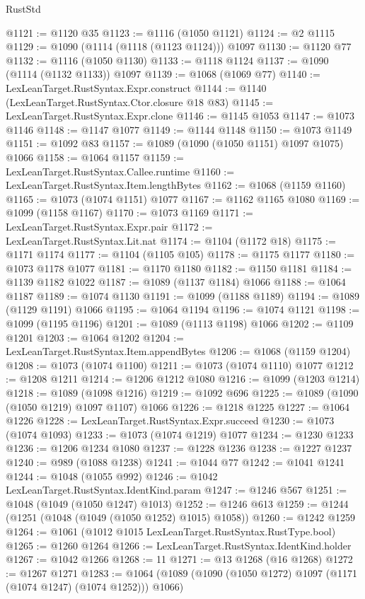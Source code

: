 \begin{lexlean}{RustStd}
\begin{coremodule}
@1121 := @1120 @35
@1123 := @1116 (@1050 @1121)
@1124 := @2 @1115
@1129 := @1090 (@1114 (@1118 (@1123 @1124))) @1097
@1130 := @1120 @77
@1132 := @1116 (@1050 @1130)
@1133 := @1118 @1124
@1137 := @1090 (@1114 (@1132 @1133)) @1097
@1139 := @1068 (@1069 @77)
@1140 := LexLeanTarget.RustSyntax.Expr.construct
@1144 := @1140 (LexLeanTarget.RustSyntax.Ctor.closure @18 @83)
@1145 := LexLeanTarget.RustSyntax.Expr.clone
@1146 := @1145 @1053
@1147 := @1073 @1146
@1148 := @1147 @1077
@1149 := @1144 @1148
@1150 := @1073 @1149
@1151 := @1092 @83
@1157 := @1089 (@1090 (@1050 @1151) @1097 @1075) @1066
@1158 := @1064 @1157
@1159 := LexLeanTarget.RustSyntax.Callee.runtime
@1160 := LexLeanTarget.RustSyntax.Item.lengthBytes
@1162 := @1068 (@1159 @1160)
@1165 := @1073 (@1074 @1151) @1077
@1167 := @1162 @1165 @1080
@1169 := @1099 (@1158 @1167)
@1170 := @1073 @1169
@1171 := LexLeanTarget.RustSyntax.Expr.pair
@1172 := LexLeanTarget.RustSyntax.Lit.nat
@1174 := @1104 (@1172 @18)
@1175 := @1171 @1174
@1177 := @1104 (@1105 @105)
@1178 := @1175 @1177
@1180 := @1073 @1178 @1077
@1181 := @1170 @1180
@1182 := @1150 @1181
@1184 := @1139 @1182 @1022
@1187 := @1089 (@1137 @1184) @1066
@1188 := @1064 @1187
@1189 := @1074 @1130
@1191 := @1099 (@1188 @1189)
@1194 := @1089 (@1129 @1191) @1066
@1195 := @1064 @1194
@1196 := @1074 @1121
@1198 := @1099 (@1195 @1196)
@1201 := @1089 (@1113 @1198) @1066
@1202 := @1109 @1201
@1203 := @1064 @1202
@1204 := LexLeanTarget.RustSyntax.Item.appendBytes
@1206 := @1068 (@1159 @1204)
@1208 := @1073 (@1074 @1100)
@1211 := @1073 (@1074 @1110) @1077
@1212 := @1208 @1211
@1214 := @1206 @1212 @1080
@1216 := @1099 (@1203 @1214)
@1218 := @1089 (@1098 @1216)
@1219 := @1092 @696
@1225 := @1089 (@1090 (@1050 @1219) @1097 @1107) @1066
@1226 := @1218 @1225
@1227 := @1064 @1226
@1228 := LexLeanTarget.RustSyntax.Expr.succeed
@1230 := @1073 (@1074 @1093)
@1233 := @1073 (@1074 @1219) @1077
@1234 := @1230 @1233
@1236 := @1206 @1234 @1080
@1237 := @1228 @1236
@1238 := @1227 @1237
@1240 := @989 (@1088 @1238)
@1241 := @1044 @77
@1242 := @1041 @1241
@1244 := @1048 (@1055 @992)
@1246 := @1042 LexLeanTarget.RustSyntax.IdentKind.param
@1247 := @1246 @567
@1251 := @1048 (@1049 (@1050 @1247) @1013)
@1252 := @1246 @613
@1259 := @1244 (@1251 (@1048 (@1049 (@1050 @1252) @1015) @1058))
@1260 := @1242 @1259
@1264 := @1061 (@1012 @1015 LexLeanTarget.RustSyntax.RustType.bool)
@1265 := @1260 @1264
@1266 := LexLeanTarget.RustSyntax.IdentKind.holder
@1267 := @1042 @1266
@1268 := 11
@1271 := @13 @1268 (@16 @1268)
@1272 := @1267 @1271
@1283 := @1064 (@1089 (@1090 (@1050 @1272) @1097 (@1171 (@1074 @1247) (@1074 @1252))) @1066)

\end{coremodule}
\end{lexlean}
